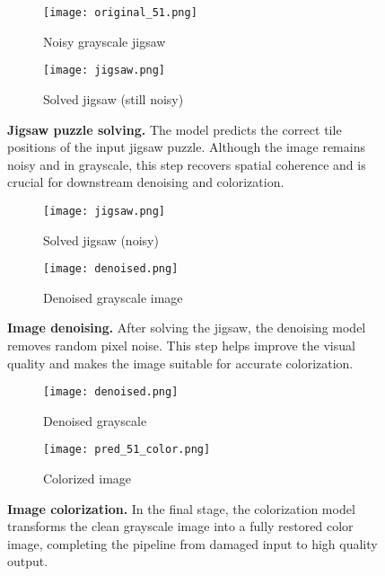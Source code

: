 \documentclass[%
 reprint,
 amsmath,amssymb,
 aps,
]{revtex4-2}
\begin{document}
\begin{figure}[H]
    \centering
    \begin{subfigure}[b]{0.45\columnwidth}
        \texttt{[image: original\_51.png]}
        \caption{Noisy grayscale jigsaw}
    \end{subfigure}
    \hfill
    \begin{subfigure}[b]{0.45\columnwidth}
        \texttt{[image: jigsaw.png]}
        \caption{Solved jigsaw (still noisy)}
    \end{subfigure}
    \caption{\textbf{Jigsaw puzzle solving.} The model predicts the correct tile positions of the input jigsaw puzzle. Although the image remains noisy and in grayscale, this step recovers spatial coherence and is crucial for downstream denoising and colorization.}
    \label{fig:step2}
\end{figure}

\begin{figure}[H]
    \centering
    \begin{subfigure}[b]{0.45\columnwidth}
        \texttt{[image: jigsaw.png]}
        \caption{Solved jigsaw (noisy)}
    \end{subfigure}
    \hfill
    \begin{subfigure}[b]{0.45\columnwidth}
        \texttt{[image: denoised.png]}
        \caption{Denoised grayscale image}
    \end{subfigure}
    \caption{\textbf{Image denoising.} After solving the jigsaw, the denoising model removes random pixel noise. This step helps improve the visual quality and makes the image suitable for accurate colorization.}
    \label{fig:step3}
\end{figure}

\begin{figure}[H]
    \centering
    \begin{subfigure}[b]{0.45\columnwidth}
        \texttt{[image: denoised.png]}
        \caption{Denoised grayscale}
    \end{subfigure}
    \hfill
    \begin{subfigure}[b]{0.45\columnwidth}
        \texttt{[image: pred\_51\_color.png]}
        \caption{Colorized image}
    \end{subfigure}
    \caption{\textbf{Image colorization.} In the final stage, the colorization model transforms the clean grayscale image into a fully restored color image, completing the pipeline from damaged input to high quality output.}
    \label{fig:step4}
\end{figure}
\end{document}
